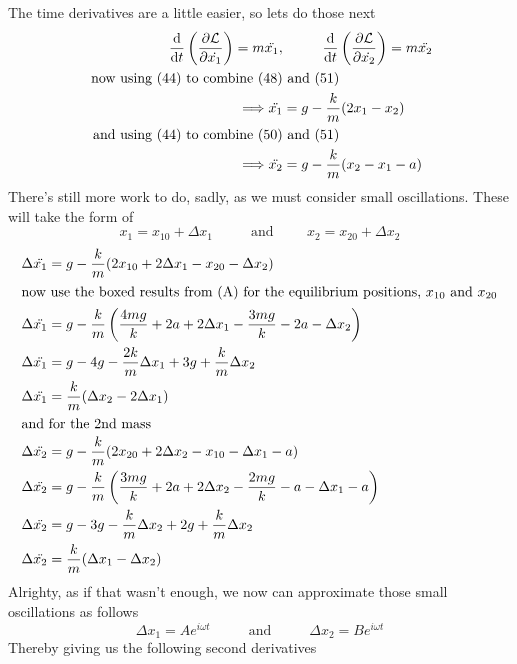 \documentclass{article}
\newcommand{\Lagr}{\mathcal{L}} %
\begin{document}
\begin{enumerate}[label=\alph*)]
	The time derivatives are a little easier, so lets do those next
	\begin{align}
		\dv{}{t} \left( \pdv{ \Lagr}{\dot{x_1}} \right) = m\ddot{x_1}, &\hspace{1cm} \dv{}{t} \left( \pdv{ \Lagr}{\dot{x_2}} \right) = m\ddot{x_2} \\
		\text{ now using (44) to combine (48)}&\text{ and (51)} \\ 
		\Longrightarrow \ddot{x_1} &= g - \frac{k}{m}(2x_1 - x_2) \\
		\text{ and using (44) to combine (50)}&\text{ and (51)} \\ 
		\Longrightarrow \ddot{x_2} &= g - \frac{k}{m}(x_2 - x_1 - a)
	\end{align}
	There's still more work to do, sadly, as we must consider small oscillations. These will take the form of 
	\[ x_1 = x_{10} + \Delta x_1 \hspace{1cm}\text{ and} \hspace{1cm} x_2 = x_{20} + \Delta x_2 \]
	\begin{align}
		\Delta\ddot{x_1} &= g - \frac{k}{m}(2x_{10} + 2\Delta x_1 - x_{20} - \Delta x_2) \\
		\intertext{now use the boxed results from (A) for the equilibrium positions, $x_{10}$  and $x_{20}$}
		\Delta\ddot{x_1} &= g - \frac{k}{m}\left(\frac{4mg}{k} + 2a + 2\Delta x_1 - \frac{3mg}{k} - 2a - \Delta x_2\right) \\
		\Delta\ddot{x_1} &= g - 4g - \frac{2k}{m}\Delta x_1 + 3g + \frac{k}{m} \Delta x_2 \\
		\Delta\ddot{x_1} &= \frac{k}{m}(\Delta x_2 - 2\Delta x_1) \\ 
		\intertext{and for the 2nd mass}
		\Delta\ddot{x_2} &= g - \frac{k}{m}(2x_{20} + 2\Delta x_2 - x_{10} - \Delta x_1 - a) \\
		\Delta\ddot{x_2} &= g - \frac{k}{m}\left(\frac{3mg}{k} + 2a + 2\Delta x_2 - \frac{2mg}{k} - a - \Delta x_1 - a\right) \\
		\Delta\ddot{x_2} &= g - 3g - \frac{k}{m}\Delta x_2 + 2g + \frac{k}{m} \Delta x_2 \\
		\Delta\ddot{x_2} &= \frac{k}{m}(\Delta x_1 - \Delta x_2)
	\end{align}
	Alrighty, as if that wasn't enough, we now can approximate those small oscillations as follows
	\[ \Delta x_1 = Ae^{i\omega t} \hspace{1cm} \text{ and } \hspace{1cm} \Delta x_2 = Be^{i\omega t} \]
	Thereby giving us the following second derivatives

\end{enumerate}
\end{document}

